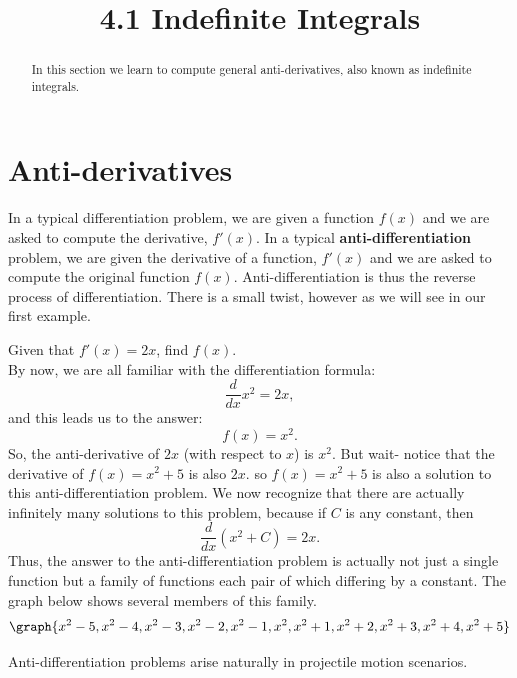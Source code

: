 \documentclass[handout]{ximera}
\title{4.1 Indefinite Integrals}
\begin{document}
\begin{abstract}
In this section we learn to compute general anti-derivatives, also known as indefinite integrals.
\end{abstract}

\maketitle

\section{Anti-derivatives}
In a typical differentiation problem, we are given a function $f(x)$ and
we are asked to compute the derivative, $f'(x)$.
In a typical \textbf{anti-differentiation} problem, we are given the derivative of a function, $f'(x)$
and we are asked to compute the original function $f(x)$.  Anti-differentiation is thus the reverse process of differentiation.
There is a small twist, however as we will see in our first example.

\begin{example}[example 1]
Given that $f'(x) = 2x$, find $f(x)$. \\
By now, we are all familiar with the differentiation formula:
\[
\frac{d}{dx} x^2 = 2x,
\]
and this leads us to the answer:
\[
f(x) = x^2.
\]
So, the anti-derivative of $2x$ (with respect to $x$) is $x^2$.
But wait- notice that the derivative of $f(x) = x^2 + 5$ is also $2x$.
so $f(x) = x^2 + 5$ is also a solution to this anti-differentiation problem.
We now recognize that there are actually infinitely many solutions to this problem, 
because if $C$ is any constant, then
\[
\frac{d}{dx} \left(x^2 + C\right) = 2x.
\]
Thus, the answer to the anti-differentiation problem is actually not just a single function but a family of functions 
each pair of which differing by a constant.
The graph below shows several members of this family.
\[
\graph{x^2 - 5, x^2 - 4, x^2 - 3, x^2 - 2, x^2 - 1, x^2, x^2 +1, x^2 +2, x^2 +3, x^2 +4, x^2 +5}
\]

\end{example}

Anti-differentiation problems arise naturally in projectile motion scenarios.
\end{document}

